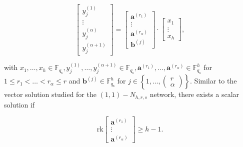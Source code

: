 \[
\left[\begin{array}{c}
y_{j}^{\left(1\right)}\\
\vdots\\
y_{j}^{\left(\alpha\right)}\\
y_{j}^{\left(\alpha+1\right)}
\end{array}\right]=\left[\begin{array}{c}
\boldsymbol{a}^{\left(r_{1}\right)}\\
\vdots\\
\boldsymbol{a}^{\left(r_{\alpha}\right)}\\
\boldsymbol{b}^{\left(j\right)}
\end{array}\right]\cdot\left[\begin{array}{c}
x_{1}\\
\vdots\\
x_{h}
\end{array}\right],
\]

with $x_{1},\ldots,x_{h}\in\ensuremath{\mathbb{F}}_{q_{\mathrm{s}}},y_{j}^{\left(1\right)},\ldots,y_{j}^{\left(\alpha+1\right)}\in\ensuremath{\mathbb{F}}_{q_{\mathrm{s}}},\boldsymbol{a}^{\left(r_{1}\right)},\ldots,\boldsymbol{a}^{\left(r_{\alpha}\right)}\in\ensuremath{\mathbb{F}}_{q_{\mathrm{s}}}^{h}$
for $1\leq r_{1}<\ldots<r_{\alpha}\leq r$ and $\boldsymbol{b}^{\left(j\right)}\in\ensuremath{\mathbb{F}}_{q_{\mathrm{s}}}^{h}$
for $j\in\left\{ 1,\ldots,\left(\begin{array}{c}
r\\
\alpha
\end{array}\right)\right\} $. Similar to the vector solution studied for the $\left(1,1\right)-\ensuremath{N}_{h,r,s}$
network, there exists a scalar solution if

\begin{equation}
\mathrm{rk}\left[\begin{array}{c}
\boldsymbol{a}^{\left(r_{1}\right)}\\
\vdots\\
\boldsymbol{a}^{\left(r_{\alpha}\right)}
\end{array}\right]\geq h-1.\label{eq:rk_rqm_scalar_1_1_hrs}
\end{equation}

